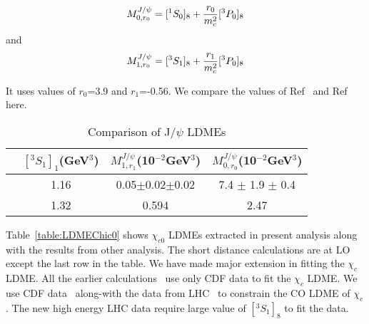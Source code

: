 \documentclass[aps,prc,preprint,superscriptaddress,showpacs,showkeys,amsmath]{revtex4-1}
\begin{document}
{\begin{equation}
M^{J/\psi}_{0,r_{0}} = [^1S_0]_{8}  + \frac{r_{0}}{m_{c}^{2}}[^3P_0]_{8}\\ \nonumber
\end{equation}
and
\begin{equation}
M^{J/\psi}_{1,r_{0}} = [^3S_1]_{8}  + \frac{r_{1}}{m_{c}^{2}}[^3P_0]_{8}\\ \nonumber
\end{equation}

It uses values of $r_{0}$=3.9 and $r_{1}$=-0.56. We compare the values of Ref~\cite{Butenschoen:2010rq}
and Ref~\cite{Ma:2010jj} here.

\begin{table}[h]
\caption{Comparison of J/$\psi$ LDMEs}
\begin{tabular}{|l|c|c|c|}
\hline            
                             &$[^3S_1]_{1}$(GeV$^3$)                     &$M^{J/\psi}_{1,r_{1}}$(10$^{-2}$GeV$^3$)    &$M^{J/\psi}_{0,r_{0}}$(10$^{-2}$GeV$^3$)  \\        
\hline
\cite{Ma:2010jj}             &1.16                                     &0.05$\pm$0.02$\pm$0.02              &7.4 $\pm$ 1.9 $\pm$ 0.4 \\
\cite{Butenschoen:2010rq}    &1.32                                     &0.594                               &2.47 \\
\hline
\end{tabular}
\label{table:LDMEJPsiNLO}
\end{table}









Table~\ref{table:LDMEChic0} shows $\chi_{c0}$ LDMEs extracted in present analysis along with the results from other
analysis. The short distance calculations are at LO except the last row in the table. We have made major extension in fitting
the $\chi_{c}$ LDME. All the earlier calculations~\cite{Cho:1995vh,Braaten:1999qk,Sharma:2012dy} use only CDF data to
fit the $\chi_{c}$ LDME. We use CDF data~\cite{Abe:1997yz} along-with the data from LHC~\cite{ATLAS:2014ala,Chatrchyan:2012ub,Aaij:2013dja} 
to constrain the CO LDME of $\chi_{c}$. The new high energy LHC data require large value of $[^3S_1]_{8}$ to fit the data.  
}

\
\\
\end{document}
